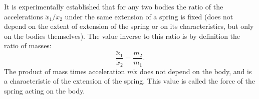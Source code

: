 It is experimentally established that for any two bodies the ratio of the accelerations $\ddot{x}_1 / \ddot{x}_2$ under the same extension of a spring is fixed (does not depend on the extent of extension of the spring or on its characteristics, but only on the bodies themselves). The value inverse to this ratio is by definition the ratio of masses:
$$\frac{\ddot{x}_1}{\ddot{x}_2} = \frac{m_2}{m_1}.$$
The product of mass times acceleration $m\ddot{x}$ does not depend on the body, and is a characteristic of the extension of the spring. This value is called the force of the spring acting on the body.
